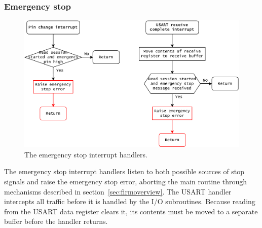 \documentclass{article}
\begin{document}
	\newpage
	\subsubsection{Emergency stop}
	\label{sec:estop}
	
	\begin{figure}[h]
		\includegraphics[width=\linewidth]{img/estop}
		\caption{The emergency stop interrupt handlers.}
	\end{figure}
	
	The emergency stop interrupt handlers listen to both possible sources of
	stop signals and raise the emergency stop error, aborting the main routine
	through mechanisms described in section~\ref{sec:firmoverview}. The USART
	handler intercepts all traffic before it is handled by the I/O subroutines.
	Because reading from the USART data register clears it, its contents must
	be moved to a separate buffer before the handler returns.
	
\end{document}
